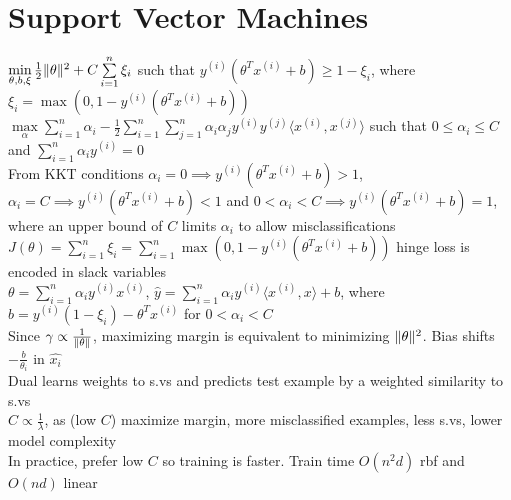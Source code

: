 \documentclass{article}
\newcommand\inner[2]{\langle #1, #2 \rangle}
\DeclarePairedDelimiter\norm{\lVert}{\rVert}
\begin{document}
\section{Support Vector Machines}
$\min\limits_{\theta, b, \xi} \frac{1}{2} \norm{\theta} ^2 + C\sum\limits_{i=1}^n\xi_i$ such that $y^{(i)}(\theta^Tx^{(i)} + b) \geq 1 - \xi_i$, where $\xi_i = \max(0, 1-y^{(i)}(\theta^Tx^{(i)} + b))$ \\
$\max\limits_\alpha \sum\limits_{i=1}^n \alpha_i - \frac{1}{2}\sum\limits_{i=1}^n\sum\limits_{j=1}^n \alpha_i \alpha_j y^{(i)}y^{(j)}\inner{x^{(i)}}{x^{(j)}}$ such that $0 \leq \alpha_i \leq C$ and $\sum\limits_{i=1}^n \alpha_i y^{(i)} = 0$ \\
From KKT conditions $\alpha_i = 0 \implies y^{(i)}(\theta^Tx^{(i)} + b) > 1$, $\alpha_i = C \implies y^{(i)}(\theta^Tx^{(i)} + b) < 1$ and $0 < \alpha_i < C \implies y^{(i)}(\theta^Tx^{(i)} + b) = 1$, where an upper bound of $C$ limits $\alpha_i$ to allow misclassifications \\
$J(\theta) = \sum\limits_{i=1}^n \xi_i = \sum\limits_{i=1}^n \max(0, 1-y^{(i)}(\theta^Tx^{(i)} + b))$ hinge loss is encoded in slack variables \\
$\theta = \sum\limits_{i=1}^n \alpha_i y^{(i)}x^{(i)}$, $\hat y = \sum\limits_{i=1}^n \alpha_i y^{(i)} \inner{x^{(i)}}{x} + b$, where $b = y^{(i)}(1 - \xi_i) - \theta^T x^{(i)}$ for $0 < \alpha_i < C$ \\
Since $\gamma \propto \frac{1}{\norm \theta}$, maximizing margin is equivalent to minimizing $\norm{\theta}^2$. Bias shifts $-\frac{b}{\theta_i}$ in $\hat{x_i}$ \\
Dual learns weights to s.vs and predicts test example by a weighted similarity to s.vs \\
$C \propto \frac{1}{\lambda}$, as (low $C$) maximize margin, more misclassified examples, less s.vs, lower model complexity \\
In practice, prefer low $C$ so training is faster. Train time $O(n^2d)$ rbf and $O(nd)$ linear
\end{document}

